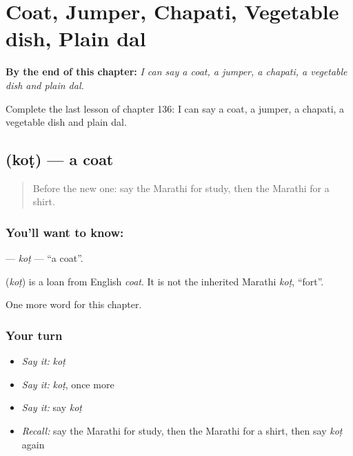
\chapter{Coat, Jumper, Chapati, Vegetable dish, Plain dal}
\label{ch:mr-coat-jumper-chapati-vegetable-dish-plain-dal}

\begin{chapteropening}
\textbf{By the end of this chapter:} \emph{I can say a coat, a jumper, a chapati, a vegetable dish and plain dal.}

Complete the last lesson of chapter 136: I can say a coat, a jumper, a chapati, a vegetable dish and plain dal.
\end{chapteropening}

\section[\texorpdfstring{\mr{कोट} (koṭ)}{कोट (koṭ)}]{ (koṭ) — a coat}

\label{lesson:MR-C136-kot}



\begin{quote}
Before the new one: say the Marathi for study, then the Marathi for a shirt.
\end{quote}

\subsection*{You'll want to know: }
\textbf{} — \emph{koṭ} — \textquotedblleft{}a coat\textquotedblright{}.

\begin{cousinweb}
\textbf{} (\emph{koṭ}) is a loan from English \emph{coat}. It is not the inherited Marathi \emph{koṭ}, \textquotedblleft{}fort\textquotedblright{}.
\end{cousinweb}

\begin{grammarlens}[title={What you've built}]
One more word for this chapter.
\end{grammarlens}

\subsection*{Your turn}
\begin{itemize}
\raggedright
  \item \emph{Say it:} \emph{koṭ}
  \item \emph{Say it:} \emph{koṭ}, once more
  \item \emph{Say it:} say \emph{koṭ}
  \item \emph{Recall:} say the Marathi for study, then the Marathi for a shirt, then say \emph{koṭ} again
\end{itemize}

